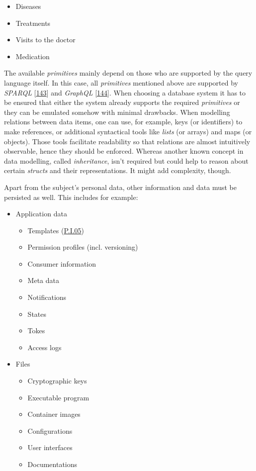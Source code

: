 \documentclass[12pt,english,a4paper,titlepage,cleardoublepage=empty,dottedtoc]{report}
\providecommand{\tightlist}{%
  \setlength{\itemsep}{0pt}\setlength{\parskip}{0pt}}
\begin{document}
\begin{itemize}
  \begin{itemize}
  \tightlist
  \item
    Diseases
  \item
    Treatments
  \item
    Visits to the doctor
  \item
    Medication
  \end{itemize}
\end{itemize}

The available \emph{primitives} mainly depend on those who are supported
by the query language itself. In this case, all \emph{primitives}
mentioned above are supported by \emph{SPARQL}
{[}\protect\hyperlink{ref-web_spec_xml_types}{143}{]} and \emph{GraphQL}
{[}\protect\hyperlink{ref-web_spec_graphql_types}{144}{]}. When choosing
a database system it has to be ensured that either the system already
supports the required \emph{primitives} or they can be emulated somehow
with minimal drawbacks. When modelling relations between data items, one
can use, for example, keys (or identifiers) to make references, or
additional syntactical tools like \emph{lists} (or arrays) and maps (or
objects). Those tools facilitate readability so that relations are
almost intuitively observable, hence they should be enforced. Whereas
another known concept in data modelling, called \emph{inheritance},
isn't required but could help to reason about certain \emph{structs} and
their representations. It might add complexity, though.

Apart from the subject's personal data, other information and data must
be persisted as well. This includes for example:

\begin{itemize}
\tightlist
\item
  Application data

  \begin{itemize}
  \tightlist
  \item
    Templates (\protect\hyperlink{pi05}{P.I.05})
  \item
    Permission profiles (incl. versioning)
  \item
    Consumer information
  \item
    Meta data
  \item
    Notifications
  \item
    States
  \item
    Tokes
  \item
    Access logs
  \end{itemize}
\item
  Files

  \begin{itemize}
  \tightlist
  \item
    Cryptographic keys
  \item
    Executable program
  \item
    Container images
  \item
    Configurations
  \item
    User interfaces
  \item
    Documentations
  \end{itemize}
\end{itemize}
\end{document}
